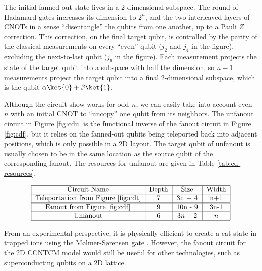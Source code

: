 The initial fanned out state lives in a $2$-dimensional subspace. The
round of Hadamard gates increases its dimension to $2^n$, and the two
interleaved layers of CNOTs in a sense ``disentangle'' the qubits from
one another, up to a Pauli $Z$ correction. This correction, on the
final target qubit, is controlled by the parity of the classical measurements
on every ``even'' qubit ($j_2$ and $j_4$ in the figure), excluding the 
next-to-last qubit ($j_6$ in the figure). Each measurement projects the state of the
target qubit
into a subspace with half the dimension, so $n-1$ measurements project
the target qubit into a final $2$-dimensional subspace, which is the
qubit $\alpha\ket{0} + \beta\ket{1}$.

Although the circuit show works for odd $n$, we can easily take into
account even $n$ with an initial CNOT to ``uncopy'' one qubit from its
neighbors. The unfanout circuit in Figure \ref{fig:cdu} is the
functional inverse of the
fanout circuit in 
Figure \ref{fig:cdf}, but it relies on the fanned-out qubits
being teleported back into adjacent positions,
which is only possible in a 2D layout.
The target qubit of unfanout is usually chosen to be in the same location
as the source qubit of the corresponding fanout. 
The resources for unfanout are given in
Table \ref{tab:cd-resources}.

\begin{table}
\begin{displaymath}
\begin{tabular}{|c|c|c|c|}
\hline
\text{Circuit Name} & \text{Depth} & \text{Size} & \text{Width}\\
\hline
\text{Teleportation from Figure \ref{fig:cdt}} & 7 & 3n + 4 & n+1\\
\hline
\text{Fanout from Figure \ref{fig:cdf}} & 9 & 10n - 9 & 3n-1 \\
\hline
\text{Unfanout} & $ 6 $ & $ 3n+2 $ & $ n$ \\
\hline
\end{tabular}
\end{displaymath}
\centerline{}
\label{tab:cd-resources}
\end{table}

From an experimental perspective, it is physically efficient to create
a cat state in trapped ions using the M{\o}lmer-S{\o}rensen gate
\cite{Sorensen2000}\cite{Benhelm2008}. However, the fanout circuit for
the 2D CCNTCM model would still be useful for other technologies, such
as superconducting qubits on a 2D lattice.
